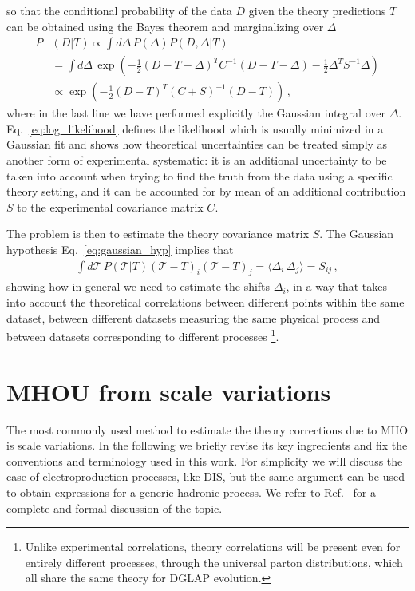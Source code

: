so that the conditional probability of the data $D$ 
given the theory predictions $T$ can be obtained using the Bayes theorem and marginalizing over $\Delta$ 
\begin{align}
    \label{eq:log_likelihood}
    P&\left(D|T\right) \propto 
    \int d\Delta\, P\left(\Delta\right)P\left(D, \Delta|T\right)  \nonumber\\
    &=\int d\Delta\, \exp\left(-\frac{1}{2}\left(D - T - \Delta\right)^T C^{-1} \left(D-T-\Delta\right) 
    -\frac{1}{2}\Delta^T S^{-1} \Delta \right) \nonumber \\
    &\propto \exp\left(-\frac{1}{2} \left(D-T\right)^T\left(C + S\right)^{-1} \left(D-T\right) \right)\,,
\end{align}
where in the last line we have performed explicitly the Gaussian integral over $\Delta$.
Eq.~\ref{eq:log_likelihood} defines the likelihood which is usually minimized in a Gaussian fit and shows how
theoretical uncertainties can be treated simply as another form of experimental systematic: 
it is an additional uncertainty to be taken into account when trying to find the truth from the data
using a specific theory setting, and it can be accounted for by mean of an additional contribution $S$ to
the experimental covariance matrix $C$.

%
The problem is then to estimate the theory covariance matrix $S$. The Gaussian hypothesis Eq.~\ref{eq:gaussian_hyp}
implies that 
\begin{align}
    \label{eq:def_th_cov_0}
    \int d\mathcal{T} \, P\left(\mathcal{T}|T\right) \left(\mathcal{T}-T\right)_i \left(\mathcal{T}-T\right)_j = 
    \langle \Delta_i \,\Delta_j \rangle = S_{ij}\,,
\end{align}
showing how in general we need to estimate the shifts $\Delta_i$, in a way that takes into account
the theoretical correlations between different points within the same dataset, between different datasets
measuring the same physical process and between datasets corresponding to different processes
\footnote{Unlike experimental correlations, theory correlations will be present even for entirely different processes,
through the universal parton distributions, which all share the same theory for DGLAP evolution.}.

\section{MHOU from scale variations}
\label{sec:scale_var}
The most commonly used method to estimate the theory corrections due to MHO is scale variations. 
In the following we briefly revise its key ingredients and fix the conventions and terminology used in this work.
For simplicity we will discuss the case of electroproduction processes, like DIS, but the same argument
can be used to obtain expressions for a generic hadronic process. 
We refer to Ref.~\cite{AbdulKhalek:2019ihb} for a complete and formal discussion of the topic.

